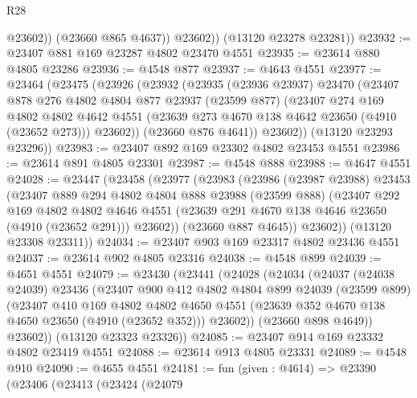 \begin{lexlean}{R28}
\begin{coremodule}
                @23602))
            (@23660 @865 @4637))
          @23602))
      (@13120 @23278 @23281))
@23932 := @23407 @881 @169 @23287 @4802 @23470 @4551
@23935 := @23614 @880 @4805 @23286
@23936 := @4548 @877
@23937 := @4643 @4551
@23977 := @23464
    (@23475
      (@23926
        (@23932
          (@23935
            (@23936 @23937)
            @23470
            (@23407
              @878
              @276
              @4802
              @4804
              @877
              @23937
              (@23599 @877)
              (@23407
                @274
                @169
                @4802
                @4802
                @4642
                @4551
                (@23639 @273 @4670 @138 @4642 @23650 (@4910 (@23652 @273)))
                @23602))
            (@23660 @876 @4641))
          @23602))
      (@13120 @23293 @23296))
@23983 := @23407 @892 @169 @23302 @4802 @23453 @4551
@23986 := @23614 @891 @4805 @23301
@23987 := @4548 @888
@23988 := @4647 @4551
@24028 := @23447
    (@23458
      (@23977
        (@23983
          (@23986
            (@23987 @23988)
            @23453
            (@23407
              @889
              @294
              @4802
              @4804
              @888
              @23988
              (@23599 @888)
              (@23407
                @292
                @169
                @4802
                @4802
                @4646
                @4551
                (@23639 @291 @4670 @138 @4646 @23650 (@4910 (@23652 @291)))
                @23602))
            (@23660 @887 @4645))
          @23602))
      (@13120 @23308 @23311))
@24034 := @23407 @903 @169 @23317 @4802 @23436 @4551
@24037 := @23614 @902 @4805 @23316
@24038 := @4548 @899
@24039 := @4651 @4551
@24079 := @23430
    (@23441
      (@24028
        (@24034
          (@24037
            (@24038 @24039)
            @23436
            (@23407
              @900
              @412
              @4802
              @4804
              @899
              @24039
              (@23599 @899)
              (@23407
                @410
                @169
                @4802
                @4802
                @4650
                @4551
                (@23639 @352 @4670 @138 @4650 @23650 (@4910 (@23652 @352)))
                @23602))
            (@23660 @898 @4649))
          @23602))
      (@13120 @23323 @23326))
@24085 := @23407 @914 @169 @23332 @4802 @23419 @4551
@24088 := @23614 @913 @4805 @23331
@24089 := @4548 @910
@24090 := @4655 @4551
@24181 := fun (given : @4614) =>
  @23390
    (@23406
      (@23413
        (@23424
          (@24079

\end{coremodule}
\end{lexlean}
